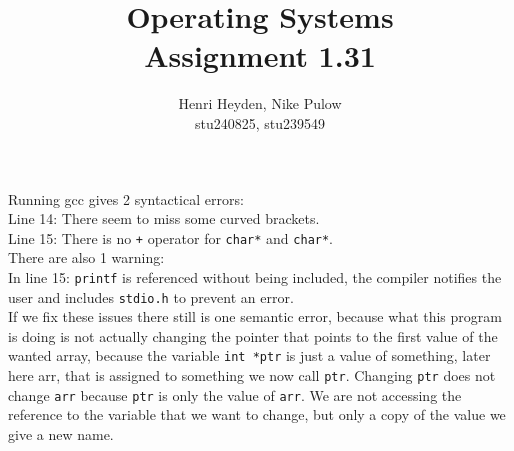 \documentclass[12pt, a4paper]{article}
\title{Operating Systems\\Assignment 1.31}
\author{Henri Heyden, Nike Pulow \\ \small stu240825, stu239549}
\date{}
\begin{document}
\maketitle

\singlespacing
\subsubsection*{}
Running gcc gives 2 syntactical errors: \\
Line 14: There seem to miss some curved brackets. \\
Line 15: There is no \verb|+| operator for \verb|char*| and \verb|char*|. \\
There are also 1 warning: \\
In line 15: \verb|printf| is referenced without being included, the compiler notifies the user and includes \verb|stdio.h| to prevent an error. \\
If we fix these issues there still is one semantic error, because what this program is doing is not actually changing the pointer that points to the first value of the wanted array, because the variable \verb|int *ptr| is just a value of something, later here arr, that is assigned to something we now call \verb|ptr|. Changing \verb|ptr| does not change \verb|arr| because \verb|ptr| is only the value of \verb|arr|. We are not accessing the reference to the variable that we want to change, but only a copy of the value we give a new name.
\end{document}
